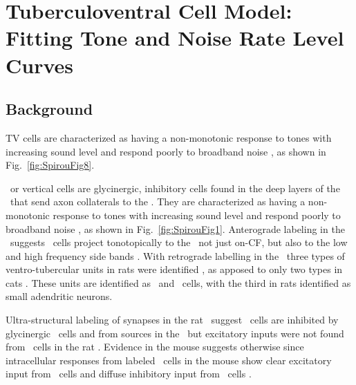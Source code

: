 \section[TV Cell Model]{Tuberculoventral Cell Model: Fitting Tone and Noise Rate Level Curves}

\subsection{Background}

TV cells are characterized as having a non-monotonic response to tones with increasing sound level and respond poorly to broadband noise \citep{SpirouDavisEtAl:1999,NelkenYoung:1997,ReissYoung:2005}, as shown in Fig.~\ref{fig:SpirouFig8}.



\TV~or vertical cells are glycinergic, inhibitory cells found in the deep layers of the \DCN~that send axon collaterals to the \VCN\@.
They are characterized as having a non-monotonic response to tones with increasing sound level and respond poorly to broadband noise \citep{SpirouDavisEtAl:1999,NelkenYoung:1997,ReissYoung:2005}, as shown in Fig.~\ref{fig:SpirouFig1}.
Anterograde labeling in the \DCN~suggests \TV~cells project tonotopically to the \VCN~not just on-CF, but also to the low and high frequency side bands \citep{MunirathinamOstapoffEtAl:2004,OstapoffMorestEtAl:1999}.
With retrograde labelling in the \DCN~three types of ventro-tubercular units in rats were identified \citet{FriedlandPongstapornEtAl:2003}, as apposed to only two types in cats \citep{SmithRhode:1989,OertelWuEtAl:1990}.
These units are identified as \TS~and \DS~cells, with the third in rats identified as small adendritic neurons.


Ultra-structural labeling of synapses in the rat \DCN~suggest \TV~cells are inhibited by glycinergic \DS~cells and from sources in the \DCN~but excitatory inputs were not found from \TS~cells in the rat \citep{Rubio:2005}.
Evidence in the mouse suggests otherwise since intracellular responses from labeled \TV~cells in the mouse show clear excitatory input from \TS~cells and diffuse inhibitory input from \DS~cells \citep{ZhangOertel:1993b,WickesbergOertel:1993}.

